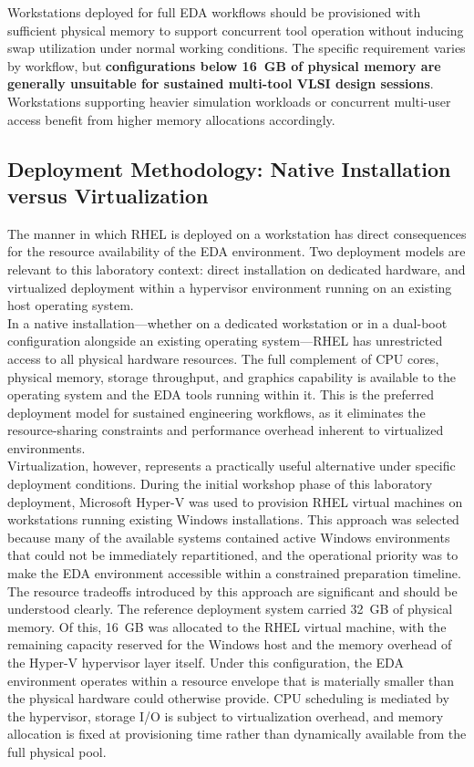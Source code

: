 Workstations deployed for full EDA workflows should be provisioned with sufficient physical
memory to support concurrent tool operation without inducing swap utilization under normal
working conditions. The specific requirement varies by workflow, but \textbf{configurations below
16~GB of physical memory are generally unsuitable for sustained multi-tool VLSI design
sessions}. Workstations supporting heavier simulation workloads or concurrent multi-user access
benefit from higher memory allocations accordingly.\\

\subsection{Deployment Methodology: Native Installation versus Virtualization}

The manner in which RHEL is deployed on a workstation has direct consequences for the
resource availability of the EDA environment. Two deployment models are relevant to this
laboratory context: direct installation on dedicated hardware, and virtualized deployment
within a hypervisor environment running on an existing host operating system.\\

In a native installation---whether on a dedicated workstation or in a dual-boot configuration
alongside an existing operating system---RHEL has unrestricted access to all physical hardware
resources. The full complement of CPU cores, physical memory, storage throughput, and graphics
capability is available to the operating system and the EDA tools running within it. This is
the preferred deployment model for sustained engineering workflows, as it eliminates the
resource-sharing constraints and performance overhead inherent to virtualized environments. \\


Virtualization, however, represents a practically useful alternative under specific deployment
conditions. During the initial workshop phase of this laboratory deployment, Microsoft Hyper-V
was used to provision RHEL virtual machines on workstations running existing Windows
installations. This approach was selected because many of the available systems contained
active Windows environments that could not be immediately repartitioned, and the operational
priority was to make the EDA environment accessible within a constrained preparation timeline.\\

The resource tradeoffs introduced by this approach are significant and should be understood
clearly. The reference deployment system carried 32~GB of physical memory. Of this, 16~GB was
allocated to the RHEL virtual machine, with the remaining capacity reserved for the Windows
host and the memory overhead of the Hyper-V hypervisor layer itself. Under this configuration,
the EDA environment operates within a resource envelope that is materially smaller than the
physical hardware could otherwise provide. CPU scheduling is mediated by the hypervisor,
storage I/O is subject to virtualization overhead, and memory allocation is fixed at provisioning
time rather than dynamically available from the full physical pool.\\


